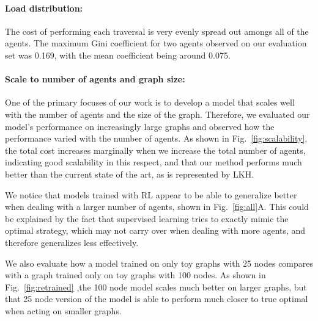 \vspace{-0.1in}
\paragraph{Load distribution:} The cost of performing each traversal is very evenly spread out
amongs all of the agents. The maximum Gini coefficient for two agents observed on our evaluation set
was 0.169, with the mean coefficient being around 0.075.

\vspace{-0.1in}
\paragraph{Scale to number of agents and graph size:}  One
of the primary focuses of our work is to develop a model that scales well with the number of agents
and the size of the graph. Therefore, we evaluated our model's performance on increasingly large
graphs and observed how the performance varied with the number of agents.  As shown in Fig.~\ref{fig:scalability}, 
 the total cost increases marginally when we increase the total number of agents,
indicating good scalability in this respect, and that our method performs much better than the
current state of the art, as is represented by LKH.


We notice that models trained with RL appear to be able to generalize better when dealing with a
larger number of agents, shown in Fig.~\ref{fig:all}A. This could be explained by the fact that
supervised learning tries to exactly mimic the optimal strategy, which may not carry over when
dealing with more agents, and therefore generalizes less effectively.

We also evaluate how a model trained on only toy graphs with 25 nodes compares with a graph trained
only on toy graphs with 100 nodes.
As shown in Fig.~\ref{fig:retrained} ,the 100 node model scales much
better on larger graphs, but that  25 node version of the model is able to perform much closer to
true optimal when acting on smaller graphs.



